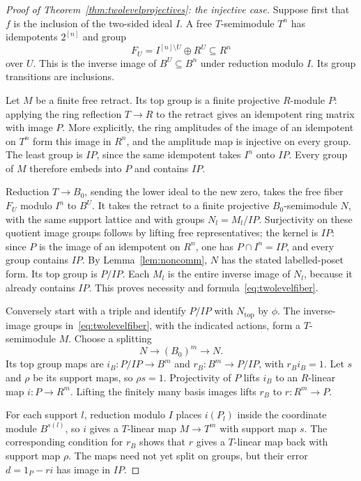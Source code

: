 \documentclass[11pt]{amsart}
\theoremstyle{definition}
\theoremstyle{remark}
\begin{document}
\begin{proof}[Proof of Theorem~\ref{thm:twolevelprojectives}: the injective case]
Suppose first that $f$ is the inclusion of the two-sided ideal $I$. A free $T$-semimodule $T^n$ has idempotents $2^{[n]}$ and group
\[
 F_U=I^{[n]\setminus U}\oplus R^U\subseteq R^n
\]
over $U$. This is the inverse image of $B^U\subseteq B^n$ under reduction modulo $I$. Its group transitions are inclusions.

Let $M$ be a finite free retract. Its top group is a finite projective $R$-module $P$: applying the ring reflection $T\to R$ to the retract gives an idempotent ring matrix with image $P$. More explicitly, the ring amplitudes of the image of an idempotent on $T^n$ form this image in $R^n$, and the amplitude map is injective on every group. The least group is $IP$, since the same idempotent takes $I^n$ onto $IP$. Every group of $M$ therefore embeds into $P$ and contains $IP$.

Reduction $T\to B_0$, sending the lower ideal to the new zero, takes the free fiber $F_U$ modulo $I^n$ to $B^U$. It takes the retract to a finite projective $B_0$-semimodule $N$, with the same support lattice and with groups $N_l=M_l/IP$. Surjectivity on these quotient image groups follows by lifting free representatives; the kernel is $IP$: since $P$ is the image of an idempotent on $R^n$, one has $P\cap I^n=IP$, and every group contains $IP$. By Lemma~\ref{lem:noncomm}, $N$ has the stated labelled-poset form. Its top group is $P/IP$. Each $M_l$ is the entire inverse image of $N_l$, because it already contains $IP$. This proves necessity and formula~\eqref{eq:twolevelfiber}.

Conversely start with a triple and identify $P/IP$ with $N_{\mathrm{top}}$ by $\phi$. The inverse-image groups in~\eqref{eq:twolevelfiber}, with the indicated actions, form a $T$-semimodule $M$. Choose a splitting
\[
 N\longrightarrow (B_0)^m\longrightarrow N.
\]
Its top group maps are $i_B:P/IP\to B^m$ and $r_B:B^m\to P/IP$, with $r_Bi_B=1$. Let $s$ and $\rho$ be its support maps, so $\rho s=1$. Projectivity of $P$ lifts $i_B$ to an $R$-linear map $i:P\to R^m$. Lifting the finitely many basis images lifts $r_B$ to $r:R^m\to P$.

For each support $l$, reduction modulo $I$ places $i(P_l)$ inside the coordinate module $B^{s(l)}$, so $i$ gives a $T$-linear map $M\to T^m$ with support map $s$. The corresponding condition for $r_B$ shows that $r$ gives a $T$-linear map back with support map $\rho$. The maps need not yet split on groups, but their error $d=1_P-ri$ has image in $IP$.


\end{proof}
\end{document}
